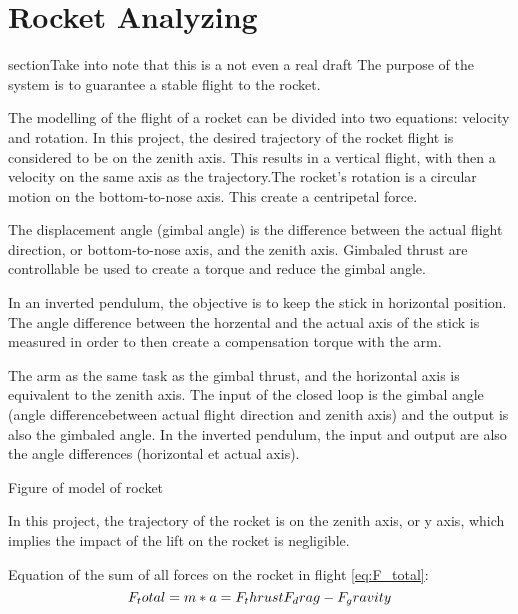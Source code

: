 \chapter{Rocket Analyzing}

section{Take into note that this is a not even a real draft}
The purpose of the system is to guarantee a stable flight to the rocket.

The modelling of the flight of a rocket can be divided into two equations: velocity and rotation. In this project, the desired trajectory of the rocket flight is considered to be on the zenith axis. This results in a vertical flight, with then a velocity on the same axis as the trajectory.The rocket's rotation is a circular motion on the bottom-to-nose axis. This create a centripetal force.

The displacement angle (gimbal angle) is the difference between the actual flight direction, or bottom-to-nose axis, and the zenith axis. Gimbaled thrust are controllable be used to create a torque and reduce the gimbal angle. 

In an inverted pendulum, the objective is to keep the stick in horizontal position. The angle difference between the horzental and the actual axis of the stick is measured in order to then create a compensation torque with the arm.

The arm as the same task as the gimbal thrust, and the horizontal axis is equivalent to the zenith axis.
The input of the closed loop is the gimbal angle (angle differencebetween actual flight direction and zenith axis) and the output is also the gimbaled angle. In the inverted pendulum, the input and output are also the angle differences (horizontal et actual axis). 



Figure of model of rocket

In this project, the trajectory of the rocket is on the zenith axis, or y axis, which implies the impact of the lift on the rocket is negligible.

Equation of the sum of all forces on the rocket in flight \eqref{eq:F_total}:
\begin{equation}
F_total = m*a = F_thrust  F_drag - F_gravity \addunit{newton} \label{eq:F_total}
\end{equation}
\startexplain
{}
\stopexplain

